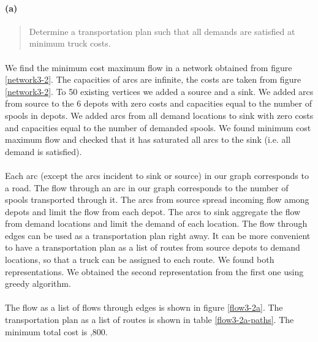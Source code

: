 \paragraph{(a)}
\begin{quote}
Determine a transportation plan such that all demands are satisfied at minimum truck costs.
\end{quote}

\paragraph{}
\paragraph{}
We find the minimum cost maximum flow in a network obtained from figure \ref{network3-2}. The capacities of arcs are infinite, the costs are taken from figure \ref{network3-2}. To 50 existing vertices we added a source and a sink. We added arcs from source to the 6 depots with zero costs and capacities equal to the number of spools in depots. We added arcs from all demand locations to sink with zero costs and capacities equal to the number of demanded spools. We found minimum cost maximum flow and checked that it has saturated all arcs to the sink (i.e. all demand is satisfied).

\paragraph{}
Each arc (except the arcs incident to sink or source) in our graph corresponds to a road. The flow through an arc in our graph corresponds to the number of spools transported through it. The arcs from source spread incoming flow among depots and limit the flow from each depot. The arcs to sink aggregate the flow from demand locations and limit the demand of each location. The flow through edges can be used as a transportation plan right away. It can be more convenient to have a transportation plan as a list of routes from source depots to demand locations, so that a truck can be assigned to each route. We found both representations. We obtained the second representation from the first one using greedy algorithm.

\paragraph{}
The flow as a list of flows through edges is shown in figure \ref{flow3-2a}. The transportation plan as a list of routes is shown in table \ref{flow3-2a-paths}. The minimum total cost is ,800.

